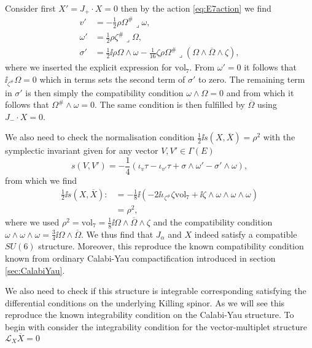 Consider first $X'=J_+\cdot X=0$ then by the action \eqref{eq:E7action} we find 
\begin{equation}
    \begin{aligned}
        v' &= -\frac{1}{2}\rho\Omega^{\#}\lrcorner\omega,\\
        \omega' &= \frac{1}{2}\rho\zeta^{\#}\lrcorner \Omega,\\
        \sigma' &= \frac{1}{2}\ii\rho\Omega\wedge \omega-\frac{1}{16}\zeta \rho\Omega^{\#}\lrcorner (\Omega\wedge\overbar{\Omega}\wedge\zeta),
    \end{aligned}
\end{equation}
where we inserted the explicit expression for $\text{vol}_7$. From $\omega'=0$ it follows that $\ii_{\zeta^{\#}}\Omega=0$ which in terms sets the second term of $\sigma'$ to zero. The remaining term in $\sigma'$ is then simply the compatibility condition $\omega\wedge\Omega=0$ and from which it follows that $\Omega^{\#}\wedge\omega=0$. The same condition is then fulfilled by $\overbar{\Omega}$ using $J_-\cdot X=0$. 


We also need to check the normalisation condition $\frac{1}{2}\ii s(X,\overbar{X})=\rho^2$ with the symplectic invariant given for any vector $V,V'\in\Gamma(E)$
\begin{equation}
    s(V,V') = -\frac{1}{4}(\iota_{v}\tau-\iota_{v'}\tau+\sigma\wedge\omega'-\sigma'\wedge\omega), 
\end{equation}
from which we find 
\begin{equation}
    \begin{aligned}
    \frac{1}{2}\ii s(X,\overbar{X}):&= -\frac{1}{8}\ii \left(-2\ii\iota_{\zeta^{\#}}\zeta\text{vol}_7+\ii\zeta\wedge\omega\wedge\omega\wedge\omega\right)\\
    &= \rho^2,
    \end{aligned}
\end{equation}
where we used $\rho^2=\text{vol}_7=\frac{1}{8}\ii\Omega\wedge\overbar{\Omega}\wedge\zeta$ and the compatibility condition $\omega\wedge\omega\wedge\omega=\frac{3}{4}\ii\Omega\wedge\overbar{\Omega}$. We thus find that $J_\alpha$ and $X$ indeed satisfy a compatible $SU(6)$ structure. Moreover, this reproduce the known compatibility condition known from ordinary Calabi-Yau compactification introduced in section \ref{sec:CalabiYau}. 

We also need to check if this structure is integrable corresponding satisfying the differential conditions on the underlying Killing spinor. As we will see this reproduce the known integrability condition on the Calabi-Yau structure. To begin with consider the integrability condition for the vector-multiplet structure $\mathscr{L}_X\overbar{X}=0$

